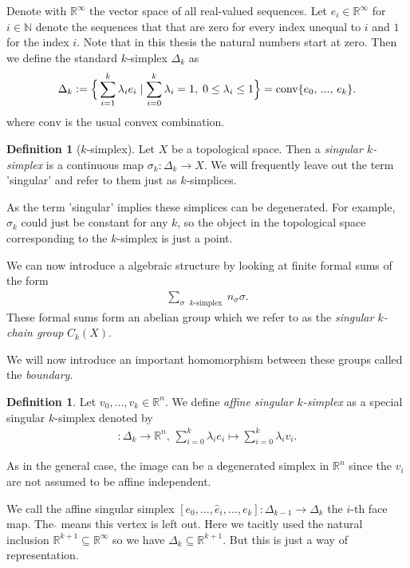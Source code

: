 \documentclass[12pt,a4paper]{article}
\numberwithin{equation}{subsection}
\numberwithin{lemma}{subsection}
\theoremstyle{definition}
\newtheorem{definition}[lemma]{Definition}
\newcommand{\naturalnum}{\mathbb{N}}
\newcommand{\real}{\mathbb{R}}
\begin{document}
Denote with $\real^\infty$ the vector space of all real-valued sequences. Let 
$e_i \in \real^\infty$ for $i \in \naturalnum$ denote the sequences that 
that are zero for every index 
unequal to $i$ and $1$ for the index $i$. Note that in this thesis 
the natural numbers start at zero. Then we define the standard $k$-simplex 
$\Delta_k$ as
\begin{align*}
    \Delta_k \vcentcolon= \Big\{ \sum\limits_{i=1}^k  \lambda_i e_i \mid 
    \sum\limits_{i=0}^k \lambda_i = 1 , \; 0\leq \lambda_i \leq 1\Big\}
    = \text{conv} \{e_0,\,...,\, e_k\}.
\end{align*}
where $\text{conv}$ is the usual convex combination. 

\begin{definition}[$k$-simplex]
Let $X$ be a topological space. Then a \textit{singular $k$-simplex} is a continuous 
map $\sigma_k: \Delta_k \rightarrow X$. We will frequently leave out the term 'singular'
and refer to them just as $k$-simplices.
\end{definition}

As the term 'singular' implies these simplices can be degenerated. For example, $\sigma_k$ could 
just be constant for any $k$, so the object in the topological space corresponding to the 
$k$-simplex is just a point.

We can now introduce a algebraic structure by looking at finite formal sums of the form 
\begin{align*}
    \sum_{\text{$\sigma$ $k$-simplex }} n_\sigma \sigma.
\end{align*}
These formal sums form an abelian group which we refer to as the 
\textit{singular $k$-chain group} $C_k(X)$. 

We will now introduce an important homomorphism between these groups called the \textit{boundary}.
\begin{definition}
    Let $v_0, ... , v_k \in \real^n$. 
    We define \textit{affine singular $k$-simplex} as a special singular $k$-simplex denoted by
    \begin{align*}
        [v_0,...,v_k]: \Delta_k \rightarrow \real^n, \, 
        \sum\limits_{i = 0}^k \lambda_i e_i \mapsto \sum\limits_{i = 0}^k \lambda_i v_i.
    \end{align*}
\end{definition}
As in the general case, the image can be a degenerated simplex in $\real^n$ since the 
$v_i$ are not assumed to be affine independent. 

We call the affine singular simplex 
$[e_0,...,\hat{e}_i,...,e_k]: \Delta_{k-1} \rightarrow \Delta_k$ the $i$-th face map. 
The $\hat{ }$ means this vertex is left out. Here we tacitly used the 
natural inclusion $\real^{k+1} \subseteq \real^\infty$ so we have 
$\Delta_k \subseteq \real^{k+1}$. But this is just a way of representation.
\end{document}
